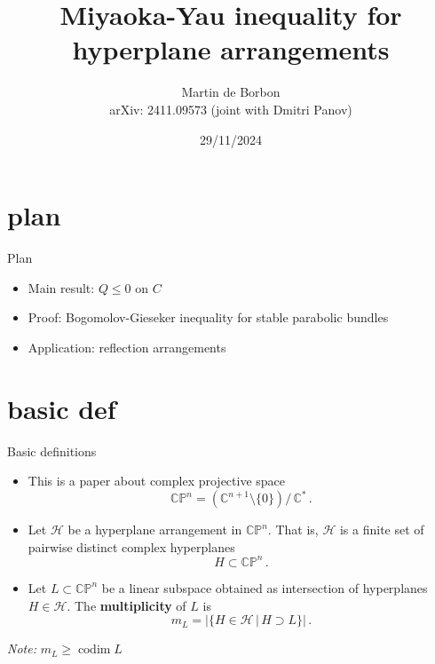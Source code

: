 \documentclass{beamer}
\title[]{Miyaoka-Yau inequality for hyperplane arrangements}
\author[Integrable Day at Loughborough]{Martin de Borbon \\
arXiv: 2411.09573 (joint with Dmitri Panov)}
\institute[]{Loughborough University}
\date{29/11/2024}
\newcommand{\C}{\mathbb{C}}
\newcommand{\CP}{\mathbb{CP}}
\newcommand{\mH}{\mathcal{H}}
\DeclareMathOperator{\codim}{codim}
\begin{document}
\begin{frame}
	\maketitle
\end{frame}


\section{plan}
\begin{frame}{Plan}
	\begin{itemize}
		\item Main result: \(Q \leq 0\) on \(C\)
		\vfill
		\item Proof: Bogomolov-Gieseker inequality for stable parabolic bundles
		\vfill
		\item Application: reflection arrangements
	\end{itemize}
\end{frame}

\section{basic def}
\begin{frame}{Basic definitions}
	\begin{itemize}
		\item This is a paper about complex projective space
		\begin{equation*}
			\CP^n = \left(\C^{n+1} \setminus \{0\}\right) \big/ \, \C^*	\,.
		\end{equation*} 
		\vfill
		
		\item Let \(\mH\) be a hyperplane arrangement in \(\CP^n\).
		That is, \(\mH\) is a finite set of pairwise distinct complex hyperplanes 
		\[
		H \subset \CP^n \,.
		\]
		\vfill
		
		\item Let \(L \subset \CP^n\) be a linear subspace  obtained as intersection of hyperplanes \(H \in \mH\). 
		The \textbf{multiplicity} of \(L\) is
		\[
		m_L = \big| \{H \in \mH \,|\, H \supset L\} \big| \,.
		\]
	\end{itemize}
	
\emph{Note:} \(m_L \geq \codim L\)
\end{frame}
\end{document}
